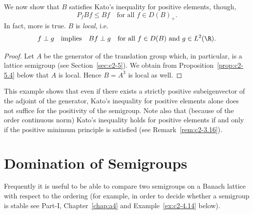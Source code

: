 We now show that $B$ satisfies Kato's inequality for positive elements, though, \ie
\begin{equation}\label{eq:c2-3.20}
P_{f} Bf \leq Bf \quad \text{for all } f \in D(B)_{+}.
\end{equation}
In fact, more is true. $B$ is \emph{local}, i.e.
\begin{equation}\label{eq:c2-3.21}
f \perp g \quad \text{implies} \quad Bf \perp g \quad \text{for all } f \in D(B) \text{ and } g \in L^{2}(\R).
\end{equation}
\begin{proof}
Let $A$ be the generator of the translation group which, in particular, is a lattice semigroup (see Section~\ref{sec:c2-5}). 
We obtain from Proposition~\ref{prop:c2-5.4} below that $A$ is local. 
Hence $B = A^{3}$ is local as well.
\end{proof}
This example shows that even if there exists a strictly positive subeigenvector of the adjoint of the generator, Kato's inequality for positive elements alone does not suffice for the positivity of the semigroup. 
Note also that (because of the order continuous norm) Kato's inequality holds for positive elements if and only if the positive minimum principle is satisfied (see Remark~\ref{rem:c2-3.16}).
\section{Domination of Semigroups} \label{sec:c2-4}
Frequently it is useful to be able to compare two semigroups on a
Banach lattice with respect to the ordering (for example, in order to
decide whether a semigroup is stable see Part-I, Chapter~\ref{chap:a4} and 
Example~\ref{ex:c2-4.14} below).

